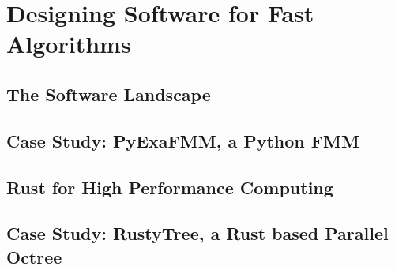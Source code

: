 \chapter{Designing Software for Fast Algorithms}\label{chpt:2}


\section{The Software Landscape}\label{sec:2_1}


\section{Case Study: PyExaFMM, a Python FMM}\label{sec:2_2}


\section{Rust for High Performance Computing}\label{sec:2_3}


\section{Case Study: RustyTree, a Rust based Parallel Octree}\label{sec:2_4}


